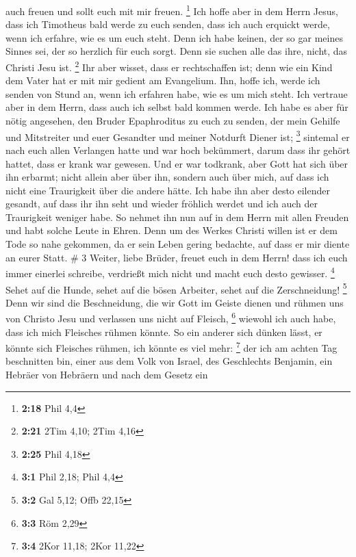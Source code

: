 auch freuen und sollt euch mit mir freuen. \footnote{\textbf{2:18} Phil
  4,4}  Ich hoffe aber in dem Herrn Jesus, dass ich
Timotheus bald werde zu euch senden, dass ich auch erquickt werde, wenn
ich erfahre, wie es um euch steht.  Denn ich habe keinen,
der so gar meines Sinnes sei, der so herzlich für euch sorgt.
 Denn sie suchen alle das ihre, nicht, das Christi Jesu
ist. \footnote{\textbf{2:21} 2Tim 4,10; 2Tim 4,16}  Ihr
aber wisset, dass er rechtschaffen ist; denn wie ein Kind dem Vater hat
er mit mir gedient am Evangelium.  Ihn, hoffe ich, werde
ich senden von Stund an, wenn ich erfahren habe, wie es um mich steht.
 Ich vertraue aber in dem Herrn, dass auch ich selbst bald
kommen werde.  Ich habe es aber für nötig angesehen, den
Bruder Epaphroditus zu euch zu senden, der mein Gehilfe und Mitstreiter
und euer Gesandter und meiner Notdurft Diener ist; \footnote{\textbf{2:25}
  Phil 4,18}  sintemal er nach euch allen Verlangen hatte
und war hoch bekümmert, darum dass ihr gehört hattet, dass er krank war
gewesen.  Und er war todkrank, aber Gott hat sich über ihn
erbarmt; nicht allein aber über ihn, sondern auch über mich, auf dass
ich nicht eine Traurigkeit über die andere hätte.  Ich habe
ihn aber desto eilender gesandt, auf dass ihr ihn seht und wieder
fröhlich werdet und ich auch der Traurigkeit weniger habe. 
So nehmet ihn nun auf in dem Herrn mit allen Freuden und habt solche
Leute in Ehren.  Denn um des Werkes Christi willen ist er
dem Tode so nahe gekommen, da er sein Leben gering bedachte, auf dass er
mir diente an eurer Statt. \# 3  Weiter, liebe Brüder,
freuet euch in dem Herrn! dass ich euch immer einerlei schreibe,
verdrießt mich nicht und macht euch desto gewisser. \footnote{\textbf{3:1}
  Phil 2,18; Phil 4,4}  Sehet auf die Hunde, sehet auf die
bösen Arbeiter, sehet auf die Zerschneidung! \footnote{\textbf{3:2} Gal
  5,12; Offb 22,15}  Denn wir sind die Beschneidung, die wir
Gott im Geiste dienen und rühmen uns von Christo Jesu und verlassen uns
nicht auf Fleisch, \footnote{\textbf{3:3} Röm 2,29}  wiewohl
ich auch habe, dass ich mich Fleisches rühmen könnte. So ein anderer
sich dünken lässt, er könnte sich Fleisches rühmen, ich könnte es viel
mehr: \footnote{\textbf{3:4} 2Kor 11,18; 2Kor 11,22}  der
ich am achten Tag beschnitten bin, einer aus dem Volk von Israel, des
Geschlechts Benjamin, ein Hebräer von Hebräern und nach dem Gesetz ein
